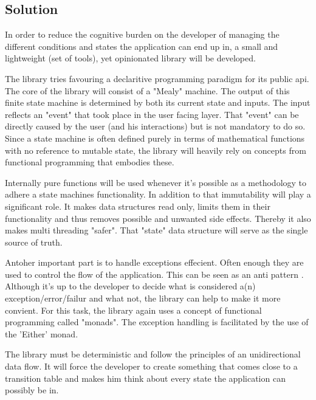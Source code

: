 \subsection{Solution}
\label{subsec:solution}

In order to reduce the cognitive burden on the developer of managing the different conditions and 
states the application can end up in, a small and lightweight (set of tools), yet opinionated library will be developed.

The library tries favouring a declaritive programming paradigm for its public api.
The core of the library will consist of a "Mealy" machine. 
The output of this finite state machine is determined by both its current state and inputs.
The input reflects an "event" that took place in the user facing layer.
That "event" can be directly caused by the user (and his interactions) but is not mandatory to do so.
Since a state machine is often defined purely in terms of mathematical functions with no reference to mutable state, 
the library will heavily rely on concepts from functional programming that embodies these.

Internally pure functions will be used whenever it's possible as a methodology to adhere a state machines functionality.
In addition to that immutability will play a significant role. It makes data structures read only, limits them in their functionality 
and thus removes possible and unwanted side effects. Thereby it also makes multi threading "safer".
That "state" data structure will serve as the single source of truth.

Antoher important part is to handle exceptions effecient. Often enough they are used to control the flow of
the application. This can be seen as an anti pattern \cite{dontUseExceptionsForFlowControl}.
Although it's up to the developer to decide what is considered a(n) exception/error/failur and what not, 
the library can help to make it more convient.
For this task, the library again uses a concept of functional programming called "monads".
The exception handling is facilitated by the use of the 'Either' monad. 


The library must be deterministic and follow the principles of an unidirectional data flow. 
It will force the developer to create something that comes close to a transition table and makes him 
think about every state the application can possibly be in.

